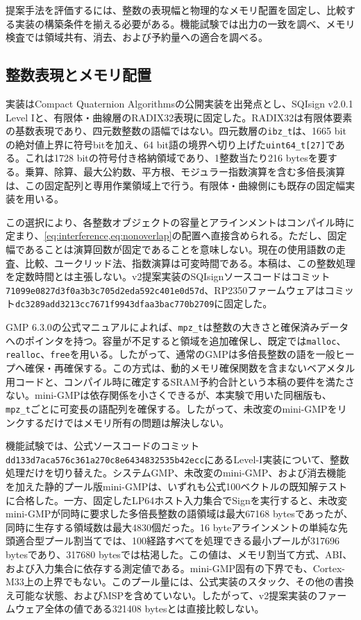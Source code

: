 \documentclass[a4paper,10pt]{ltjsarticle}
\theoremstyle{definition}
\theoremstyle{remark}
\begin{document}
提案手法を評価するには、整数の表現幅と物理的なメモリ配置を固定し、比較する実装の構築条件を揃える必要がある。機能試験では出力の一致を調べ、メモリ検査では領域共有、消去、および予約量への適合を調べる。

\subsection{整数表現とメモリ配置}

実装はCompact Quaternion Algorithmsの公開実装を出発点とし、SQIsign v2.0.1 Level Iと、有限体・曲線層のRADIX32表現に固定した。RADIX32は有限体要素の基数表現であり、四元数整数の語幅ではない。四元数層の\texttt{ibz\_t}は、1665 bitの絶対値上界に符号bitを加え、64 bit語の境界へ切り上げた\texttt{uint64\_t[27]}である。これは1728 bitの符号付き格納領域であり、1整数当たり216 bytesを要する。乗算、除算、最大公約数、平方根、モジュラー指数演算を含む多倍長演算は、この固定配列と専用作業領域上で行う。有限体・曲線側にも既存の固定幅実装を用いる。

この選択により、各整数オブジェクトの容量とアラインメントはコンパイル時に定まり、\cref{eq:interference,eq:nonoverlap}の配置へ直接含められる。ただし、固定幅であることは演算回数が固定であることを意味しない。現在の使用語数の走査、比較、ユークリッド法、指数演算は可変時間である。本稿は、この整数処理を定数時間とは主張しない。v2提案実装のSQIsignソースコードはコミット\texttt{71099e0827d3f0a3b3c705d2eda592c401e0d57d}、RP2350ファームウェアはコミット\texttt{dc3289add3213cc7671f9943dfaa3bac770b2709}に固定した。

GMP 6.3.0の公式マニュアルによれば、\texttt{mpz\_t}は整数の大きさと確保済みデータへのポインタを持つ。容量が不足すると領域を追加確保し、既定では\texttt{malloc}、\texttt{realloc}、\texttt{free}を用いる\cite{gmp-manual-630}。したがって、通常のGMPは多倍長整数の語を一般ヒープへ確保・再確保する。この方式は、動的メモリ確保関数を含まないベアメタル用コードと、コンパイル時に確定するSRAM予約合計という本稿の要件を満たさない。mini-GMPは依存関係を小さくできるが、本実験で用いた同梱版も、\texttt{mpz\_t}ごとに可変長の語配列を確保する。したがって、未改変のmini-GMPをリンクするだけではメモリ所有の問題は解決しない。

機能試験では、公式ソースコードのコミット\texttt{dd133d7aca576c361a270c8e6434832535b42ecc}にあるLevel-I実装について、整数処理だけを切り替えた。システムGMP、未改変のmini-GMP、および消去機能を加えた静的プール版mini-GMPは、いずれも公式100ベクトルの既知解テストに合格した。一方、固定したLP64ホスト入力集合でSignを実行すると、未改変mini-GMPが同時に要求した多倍長整数の語領域は最大\num{67168} bytesであったが、同時に生存する領域数は最大\num{4830}個だった。16 byteアラインメントの単純な先頭適合型プール割当てでは、100経路すべてを処理できる最小プールが\num{317696} bytesであり、\num{317680} bytesでは枯渇した。この値は、メモリ割当て方式、ABI、および入力集合に依存する測定値である。mini-GMP固有の下界でも、Cortex-M33上の上界でもない。このプール量には、公式実装のスタック、その他の書換え可能な状態、およびMSPを含めていない。したがって、v2提案実装のファームウェア全体の値である\num{321408} bytesとは直接比較しない。
\end{document}
